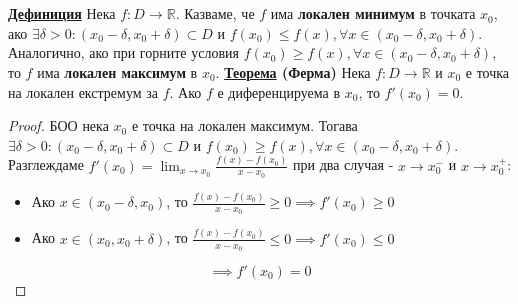 \documentclass{article}
\begin{document}
\section*{\centering \color{lightGreen}{Диференциално и интегрално смятане}}

\subsection*{\color{lightGreen}{30. Теорема на Ферма. Теореми за средните стойности (Рол, Лагранж и Коши). Формула на Тейлър.}}

\textbf{\underline{Дефиниция}}
Нека $f : D \rightarrow \mathbb{R}$. Казваме, че $f$ има \textbf{локален минимум} в точката $x_0$, ако $\exists \delta > 0 :
(x_0 - \delta, x_0 + \delta) \subset D$ и $f(x_0) \le f(x), \forall x \in (x_0 - \delta, x_0 + \delta)$.
Аналогично, ако при горните условия $f(x_0) \ge f(x), \forall x \in (x_0 - \delta, x_0 + \delta)$, то $f$ има
\textbf{локален максимум} в $x_0$. \newline\newline
\textbf{\underline{Теорема} (Ферма)} \newline
Нека $f : D \rightarrow \mathbb{R}$ и $x_0$ е точка на локален екстремум за $f$. Ако $f$ е диференцируема в $x_0$, то $f'(x_0) = 0$.
\begin{proof}
БОО нека $x_0$ е точка на локален максимум. Тогава $\exists \delta > 0 : (x_0 - \delta, x_0 + \delta) \subset D$
и $f(x_0) \ge f(x), \forall x \in (x_0 - \delta, x_0 + \delta)$. Разглеждаме $f'(x_0) = \lim_{x \rightarrow x_0} \frac{f(x) -
f(x_0)}{x - x_0}$ при два случая - $x \rightarrow x_0^-$ и $x \rightarrow x_0^+$:
\begin{itemize}
    \item Ако $x \in (x_0 - \delta, x_0)$, то $\frac{f(x) - f(x_0)}{x - x_0} \geq 0 \implies f'(x_0) \geq 0$
    \item Ако $x \in (x_0, x_0 + \delta)$, то $\frac{f(x) - f(x_0)}{x - x_0} \leq 0 \implies f'(x_0) \leq 0$
\end{itemize}
$$\implies f'(x_0) = 0$$
\end{proof}
\end{document}
